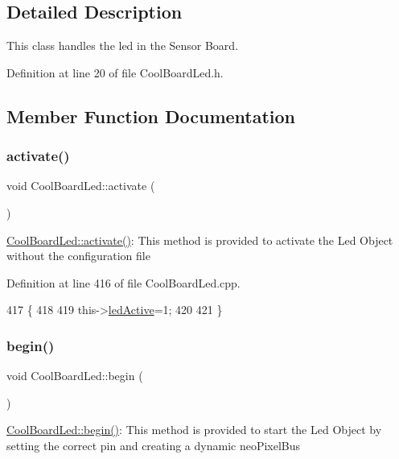 \subsection{Detailed Description}
This class handles the led in the Sensor Board. 

Definition at line 20 of file Cool\+Board\+Led.\+h.



\subsection{Member Function Documentation}
\mbox{\label{class_cool_board_led_ae74fe4b47d06c3a97b468ba220c4eb99}} 
\subsubsection{\texorpdfstring{activate()}{activate()}}
{\footnotesize\ttfamily void Cool\+Board\+Led\+::activate (\begin{DoxyParamCaption}{ }\end{DoxyParamCaption})}

\hyperlink{class_cool_board_led_ae74fe4b47d06c3a97b468ba220c4eb99}{Cool\+Board\+Led\+::activate()}\+: This method is provided to activate the Led Object without the configuration file 

Definition at line 416 of file Cool\+Board\+Led.\+cpp.


\begin{DoxyCode}
417 \{
418 
419     this->\hyperlink{class_cool_board_led_aadd04d2ecf123247718d77f42fba7f08}{ledActive}=1;
420 
421 \}
\end{DoxyCode}
\mbox{\label{class_cool_board_led_ae3cbde8affcc6f011cbd698c8ef911f6}} 
\subsubsection{\texorpdfstring{begin()}{begin()}}
{\footnotesize\ttfamily void Cool\+Board\+Led\+::begin (\begin{DoxyParamCaption}{ }\end{DoxyParamCaption})}

\hyperlink{class_cool_board_led_ae3cbde8affcc6f011cbd698c8ef911f6}{Cool\+Board\+Led\+::begin()}\+: This method is provided to start the Led Object by setting the correct pin and creating a dynamic neo\+Pixel\+Bus 

